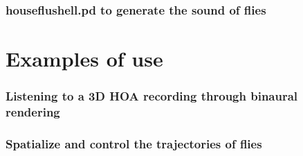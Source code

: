\documentclass[10pt,a4paper]{article}
\begin{document}
\subsubsection{houseflushell.pd to generate the sound of flies}

\section{Examples of use}
\subsubsection{Listening to a 3D HOA recording through binaural rendering}
\subsubsection{Spatialize and control the trajectories of flies}


\end{document}
